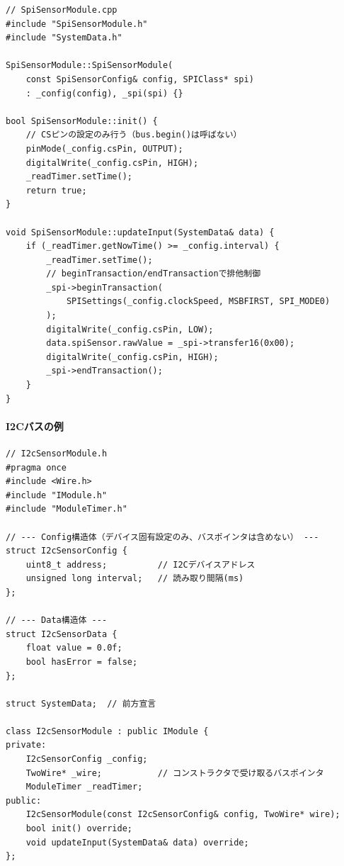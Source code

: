 \begin{lstlisting}[style=cppstyle, caption={SPIバスを使用するモジュールの実装}]
// SpiSensorModule.cpp
#include "SpiSensorModule.h"
#include "SystemData.h"

SpiSensorModule::SpiSensorModule(
    const SpiSensorConfig& config, SPIClass* spi)
    : _config(config), _spi(spi) {}

bool SpiSensorModule::init() {
    // CSピンの設定のみ行う（bus.begin()は呼ばない）
    pinMode(_config.csPin, OUTPUT);
    digitalWrite(_config.csPin, HIGH);
    _readTimer.setTime();
    return true;
}

void SpiSensorModule::updateInput(SystemData& data) {
    if (_readTimer.getNowTime() >= _config.interval) {
        _readTimer.setTime();
        // beginTransaction/endTransactionで排他制御
        _spi->beginTransaction(
            SPISettings(_config.clockSpeed, MSBFIRST, SPI_MODE0)
        );
        digitalWrite(_config.csPin, LOW);
        data.spiSensor.rawValue = _spi->transfer16(0x00);
        digitalWrite(_config.csPin, HIGH);
        _spi->endTransaction();
    }
}
\end{lstlisting}

\paragraph{I2Cバスの例}

\begin{lstlisting}[style=cppstyle, caption={I2Cバスを使用するモジュールのヘッダー}]
// I2cSensorModule.h
#pragma once
#include <Wire.h>
#include "IModule.h"
#include "ModuleTimer.h"

// --- Config構造体（デバイス固有設定のみ、バスポインタは含めない） ---
struct I2cSensorConfig {
    uint8_t address;          // I2Cデバイスアドレス
    unsigned long interval;   // 読み取り間隔(ms)
};

// --- Data構造体 ---
struct I2cSensorData {
    float value = 0.0f;
    bool hasError = false;
};

struct SystemData;  // 前方宣言

class I2cSensorModule : public IModule {
private:
    I2cSensorConfig _config;
    TwoWire* _wire;           // コンストラクタで受け取るバスポインタ
    ModuleTimer _readTimer;
public:
    I2cSensorModule(const I2cSensorConfig& config, TwoWire* wire);
    bool init() override;
    void updateInput(SystemData& data) override;
};
\end{lstlisting}

